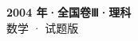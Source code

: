 \documentclass[zihao=-4, a4paper]{ctexart}
\begin{document}
\begin{center}
  {\Large\bfseries 2004 年·全国卷Ⅲ·理科}\\[4pt]
  {\large 数学 · 试题版}
\end{center}
\medskip
{}

\end{document}
